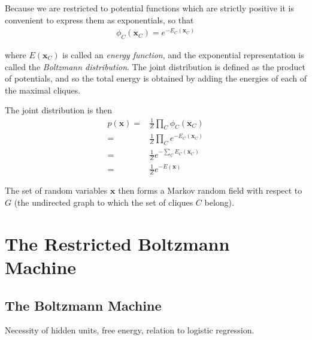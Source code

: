 \documentclass[twoside,english]{uiofysmaster}
\begin{document}
Because we are restricted to potential functions which are strictly positive it is convenient to express them as exponentials, so that
\begin{align}
	\phi_C (\bm{x}_C) = e^{-E_C(\bm{x}_C)}
\end{align}

where $E(\bm{x}_C)$ is called an \textit{energy function}, and the exponential representation is called the \textit{Boltzmann distribution}. The joint distribution is defined as the product of potentials, and so the total energy is obtained by adding the energies of each of the maximal cliques.

The joint distribution is then
\begin{align}
	p(\bm{x}) =& \frac{1}{Z} \prod_C \phi_C (\bm{x}_C) \nonumber \\
	=& \frac{1}{Z} \prod_C e^{-E_C(\bm{x}_C)} \nonumber \\
	=& \frac{1}{Z} e^{-\sum_C E_C(\bm{x}_C)} \nonumber \\
	=& \frac{1}{Z} e^{-E(\bm{x})}
\end{align} 

The set of random variables $\bm{x}$ then forms a Markov random field with respect to $G$ (the undirected graph to which the set of cliques $C$ belong). 






\chapter{The Restricted Boltzmann Machine}

\section{The Boltzmann Machine}

Necessity of hidden units, free energy, relation to logistic regression. \cite{Osogami2017}
\end{document}
